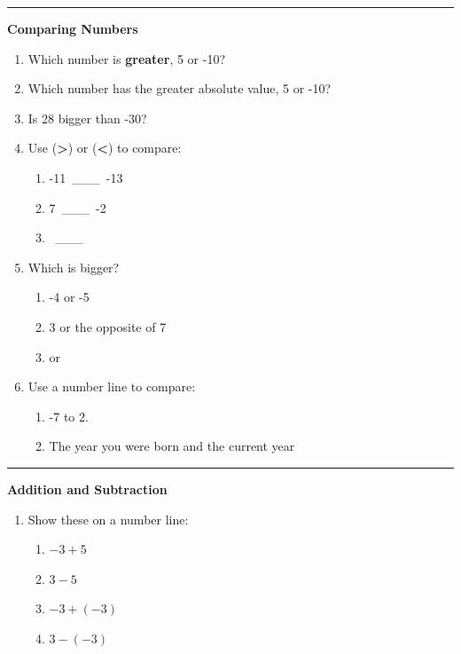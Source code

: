 \documentclass[
  letterpaper,
  DIV=11,
  numbers=noendperiod]{scrreprt}
\begin{document}
\begin{center}\rule{0.5\linewidth}{0.5pt}\end{center}

\textbf{Comparing Numbers}

\begin{enumerate}
\def\labelenumi{\arabic{enumi}.}
\setcounter{enumi}{6}
\item
  Which number is \textbf{greater}, 5 or -10?
\item
  Which number has the greater absolute value, 5 or -10?
\item
  Is 28 bigger than -30?
\item
  Use (\textbf{\textgreater{}}) or (\textbf{\textless{}}) to compare:

  \begin{enumerate}
  \def\labelenumii{\alph{enumii}.}
  \item
    -11~\_\_\_~-13
  \item
    7~\_\_\_~-2
  \item
    \textbar~\_\_\_~\textbar{}
  \end{enumerate}
\item
  Which is bigger?

  \begin{enumerate}
  \def\labelenumii{\alph{enumii}.}
  \item
    -4 or -5
  \item
    3 or the opposite of 7
  \item
    \textbar{} or \textbar{}
  \end{enumerate}
\item
  Use a number line to compare:

  \begin{enumerate}
  \def\labelenumii{\alph{enumii}.}
  \item
    -7 to 2.
  \item
    The year you were born and the current year
  \end{enumerate}
\end{enumerate}

\begin{center}\rule{0.5\linewidth}{0.5pt}\end{center}

\textbf{Addition and Subtraction}

\begin{enumerate}
\def\labelenumi{\arabic{enumi}.}
\setcounter{enumi}{12}
\item
  Show these on a number line:

  \begin{enumerate}
  \def\labelenumii{\alph{enumii}.}
  \item
    \(-3 + 5\)
  \item
    \(3 - 5\)
  \item
    \(-3 + (-3)\)
  \item
    \(3 - (-3)\)
  \end{enumerate}
\end{enumerate}
\end{document}
